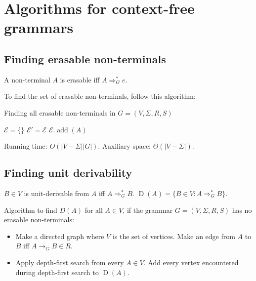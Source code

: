 \section{Algorithms for context-free grammars}

\subsection{Finding erasable non-terminals}

\begin{definition}
A non-terminal $A$ is erasable iff $A \Rightarrow_G^* e$.
\end{definition}

To find the set of erasable non-terminals, follow this algorithm:

\begin{algorithm}[H]
\caption{Finding all erasable non-terminals in $G = (V, \Sigma, R, S)$}
\label{algo-erasable-non-terminals}
\begin{algorithmic}
\State $\mathcal{E} = \{\}$
\Do
    \State $\mathcal{E}' = \mathcal{E}$
            \State $\mathcal{E}.\operatorname{add}(A)$
        \EndIf
    \EndFor
{}
\end{algorithmic}
\end{algorithm}

Running time: $O(|V-\Sigma||G|)$.
Auxiliary space: $\Theta(|V-\Sigma|)$.

\subsection{Finding unit derivability}

\begin{definition}
$B \in V$ is unit-derivable from $A$ iff $A \Rightarrow_G^* B$.
$\operatorname{D}(A) = \{B \in V: A \Rightarrow_G^* B\}$.
\end{definition}

Algorithm to find $D(A)$ for all $A \in V$,
if the grammar $G = (V, \Sigma, R, S)$ has no erasable non-terminals:
\begin{itemize}
\item Make a directed graph where $V$ is the set of vertices.
    Make an edge from $A$ to $B$ iff $A \rightarrow_G B \in R$.
\item Apply depth-first search from every $A \in V$.
    Add every vertex encountered during depth-first search to $\operatorname{D}(A)$.
\end{itemize}

